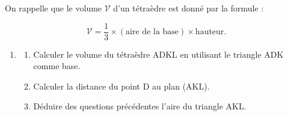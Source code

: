 \documentclass[10pt]{article}
\begin{document}
On rappelle que le volume $\mathcal{V}$ d'un tétraèdre est donné par la formule : 

\[\mathcal{V} = \dfrac{1}{3}\times  (\text{aire de la base}) \times \text{hauteur}.\]

\begin{enumerate}[resume]
\item 
	\begin{enumerate}
		\item Calculer le volume du tétraèdre ADKL en utilisant le triangle ADK comme base. 
		\item Calculer la distance du point D au plan (AKL).
		\item Déduire des questions précédentes l'aire du triangle AKL.
	\end{enumerate}
\end{enumerate}

\bigskip
\end{document}
